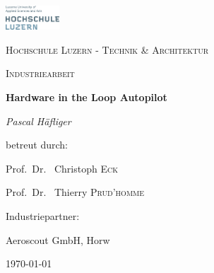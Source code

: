 
\begin{titlepage}
	\centering
	\includegraphics[width=0.15\textwidth]{pic/00_title/logo.png}
	\par\vspace{1cm}
	{\scshape\LARGE Hochschule Luzern - Technik \& Architektur \par}
	\vspace{1cm}
	{\scshape\Large Industriearbeit\par}
	\vspace{1.5cm}
	{\huge\bfseries Hardware in the Loop Autopilot\par}
	\vspace{2cm}
	{\Large\itshape Pascal Häfliger\par}
	\vfill
	betreut durch:\par
	Prof.~Dr.~ Christoph \textsc{Eck}\par
	Prof.~Dr.~ Thierry \textsc{Prud'homme}\par
	\vspace{1cm}
	Industriepartner:\par
  Aeroscout GmbH, Horw\par


	

	\vfill  %

	{\large \today\par}
\end{titlepage}



\clearpage